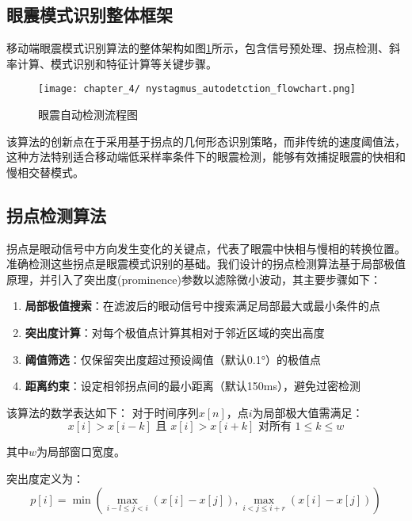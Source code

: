 \subsection{眼震模式识别整体框架}

移动端眼震模式识别算法的整体架构如图\ref{fig:nystagmus_detection}所示，包含信号预处理、拐点检测、斜率计算、模式识别和特征计算等关键步骤。

\begin{figure}[ht]
    \centering
    \texttt{[image: chapter\_4/   nystagmus\_autodetction\_flowchart.png]}
    \caption{眼震自动检测流程图}
    \label{fig:nystagmus_detection}
\end{figure}

该算法的创新点在于采用基于拐点的几何形态识别策略，而非传统的速度阈值法，这种方法特别适合移动端低采样率条件下的眼震检测，能够有效捕捉眼震的快相和慢相交替模式。

\subsection{拐点检测算法}

拐点是眼动信号中方向发生变化的关键点，代表了眼震中快相与慢相的转换位置。准确检测这些拐点是眼震模式识别的基础。我们设计的拐点检测算法基于局部极值原理，并引入了突出度(prominence)参数以滤除微小波动，其主要步骤如下：

\begin{enumerate}
  \item \textbf{局部极值搜索}：在滤波后的眼动信号中搜索满足局部最大或最小条件的点
  \item \textbf{突出度计算}：对每个极值点计算其相对于邻近区域的突出高度
  \item \textbf{阈值筛选}：仅保留突出度超过预设阈值（默认0.1°）的极值点
  \item \textbf{距离约束}：设定相邻拐点间的最小距离（默认150ms），避免过密检测
\end{enumerate}

该算法的数学表达如下：
对于时间序列$x[n]$，点$i$为局部极大值需满足：
\begin{equation}
x[i] > x[i-k] \text{ 且 } x[i] > x[i+k] \text{ 对所有 } 1 \leq k \leq w
\end{equation}

其中$w$为局部窗口宽度。

突出度定义为：
\begin{equation}
p[i] = \min(\max_{i-l \leq j < i}(x[i] - x[j]), \max_{i < j \leq i+r}(x[i] - x[j]))
\end{equation}

